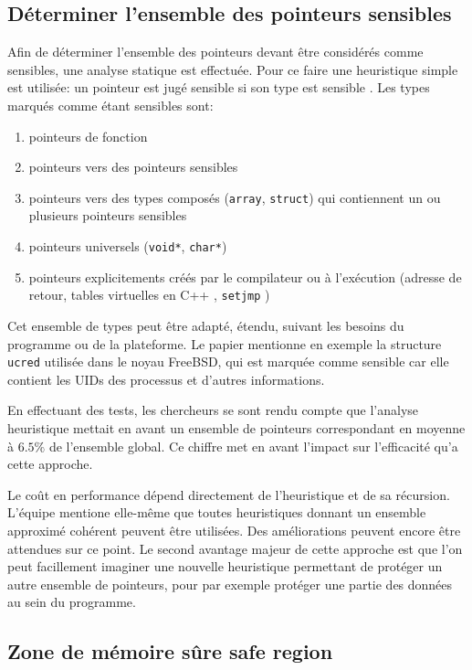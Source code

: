 \subsection{Déterminer l'ensemble des pointeurs sensibles}

Afin de déterminer l'ensemble des pointeurs devant être considérés comme sensibles, une analyse statique est effectuée. Pour ce faire une heuristique simple est utilisée: \og un pointeur est jugé sensible si son type est sensible \fg. Les types marqués comme étant sensibles sont:

\begin{enumerate}
	\item pointeurs de fonction
	\item pointeurs vers des pointeurs sensibles
	\item pointeurs vers des types composés (\texttt{array}, \texttt{struct}) qui contiennent un ou plusieurs pointeurs sensibles
	\item pointeurs universels (\texttt{void*}, \texttt{char*})
  \item pointeurs explicitements créés par le compilateur ou à l'exécution (adresse de retour, tables virtuelles en C++ \cite{fonctionsVirtuelles}, \texttt{setjmp} \cite{setjmp})
\end{enumerate}

Cet ensemble de types peut être adapté, étendu, suivant les besoins du programme ou de la plateforme. Le papier mentionne en exemple la structure \texttt{ucred} utilisée dans le noyau FreeBSD, qui est marquée comme sensible car elle contient les UIDs des processus et d'autres informations.

En effectuant des tests, les chercheurs se sont rendu compte que l'analyse heuristique mettait en avant un ensemble de pointeurs correspondant en moyenne à $6.5\%$ de l'ensemble global. Ce chiffre met en avant l'impact sur l'efficacité qu'a cette approche.

Le coût en performance dépend directement de l'heuristique et de sa récursion. L'équipe mentione elle-même que toutes heuristiques donnant un ensemble approximé cohérent peuvent être utilisées. Des améliorations peuvent encore être attendues sur ce point. Le second avantage majeur de cette approche est que l'on peut facillement imaginer une nouvelle heuristique permettant de protéger un autre ensemble de pointeurs, pour par exemple protéger une partie des données au sein du programme.

\subsection{Zone de mémoire sûre \og safe region \fg}

